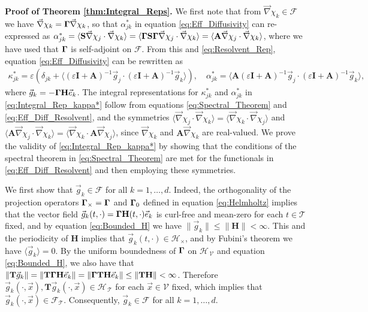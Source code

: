 \documentclass[11pt]{amsart}
\newcommand{\Tb}{\mathbf{T}}
\newcommand{\Hb}{\mathbf{H}}
\newcommand{\Ib}{\mathbf{I}}
\newcommand{\Sb}{\mathbf{S}}
\newcommand{\Ab}{\mathbf{A}}
\newcommand{\Tc}{\mathcal{T}}
\newcommand{\Vc}{\mathcal{V}}
\newcommand{\Hs}{\mathscr{H}}
\newcommand{\Fs}{\mathscr{F}}
\newcommand\bGamma{\mbox{\boldmath${\Gamma}$}}
\begin{document}
\textbf{Proof of Theorem \ref{thm:Integral_Reps}.}\hspace{1ex}
%
We first note that from $\vec{\nabla}\chi_k\in\Fs$ we have 
$\vec{\nabla}\chi_k=\bGamma\vec{\nabla}\chi_k$, so that $\alpha^*_{jk}$ in equation
\eqref{eq:Eff_Diffusivity} can re-expressed as
$\alpha^*_{jk}=\langle\Sb\vec{\nabla}\chi_j\cdot\vec{\nabla}\chi_k\rangle=\langle\bGamma\Sb\bGamma\vec{\nabla}\chi_j\cdot\vec{\nabla}\chi_k\rangle  
=\langle\Ab\vec{\nabla}\chi_j\cdot\vec{\nabla}\chi_k\rangle$, where we have used that $\bGamma$ is
self-adjoint on $\Fs$. From this and \eqref{eq:Resolvent_Rep},
equation \eqref{eq:Eff_Diffusivity} can be rewritten as
%
\begin{align}\label{eq:Eff_Diff_Resolvent}
 \kappa^*_{jk}=\varepsilon\left(\delta_{jk}+\langle(\varepsilon\Ib+\Ab)^{-1}\vec{g}_j\cdot(\varepsilon\Ib+\Ab)^{-1}\vec{g}_k\rangle\right), \quad
 \alpha^*_{jk}=\langle\Ab(\varepsilon\Ib+\Ab)^{-1}\vec{g}_j\cdot(\varepsilon\Ib+\Ab)^{-1}\vec{g}_k\rangle,
\end{align}
%
where $\vec{g}_k=-\bGamma\Hb\vec{e}_k$. The integral representations
for $\kappa^*_{jk}$ and $\alpha^*_{jk}$ in \eqref{eq:Integral_Rep_kappa*} follow
from equations \eqref{eq:Spectral_Theorem} and
\eqref{eq:Eff_Diff_Resolvent}, and the symmetries
$\langle\vec{\nabla}\chi_j\cdot\vec{\nabla}\chi_k\rangle=\langle\vec{\nabla}\chi_k\cdot\vec{\nabla}\chi_j\rangle$ and 
$\langle\Ab\vec{\nabla}\chi_j\cdot\vec{\nabla}\chi_k\rangle=\langle\vec{\nabla}\chi_k\cdot\Ab\vec{\nabla}\chi_j\rangle$, since
$\vec{\nabla}\chi_k$ and $\Ab\vec{\nabla}\chi_k$ are real-valued. We prove the
validity of \eqref{eq:Integral_Rep_kappa*} by showing that the
conditions of the spectral theorem in \eqref{eq:Spectral_Theorem} are
met for the functionals in \eqref{eq:Eff_Diff_Resolvent} and then
employing these symmetries.    





We first show that $\vec{g}_k\in\Fs$ for
all $k=1,\ldots,d$. Indeed, the orthogonality of the
projection operators $\bGamma_\times=\bGamma$ and $\bGamma_0$ defined in
equation \eqref{eq:Helmholtz} implies that the vector field
$\vec{g}_k(t,\cdot)=\bGamma\Hb(t,\cdot)\vec{e}_k$ is curl-free and mean-zero
for each $t\in\Tc$ fixed, and by equation \eqref{eq:Bounded_H} 
we have $\|\vec{g}_k\|\leq\|\Hb\|<\infty$. This and the periodicity of $\Hb$ implies
that $\vec{g}_k(t,\cdot)\in\Hs_\times$, and by Fubini's theorem \cite{Folland:99}
we have $\langle\vec{g}_k\rangle=0$.  By the uniform boundedness of $\bGamma$ on
$\Hs_{\,\Vc}$ and equation \eqref{eq:Bounded_H}, we also have
\cite{Folland:99} that
$\|\Tb\vec{g}_k\|=\|\Tb\bGamma\Hb\vec{e}_k\|=\|\bGamma\Tb\Hb\vec{e}_k\|\leq\|\Tb\Hb\|<\infty$.   
Therefore $\vec{g}_k(\cdot,\vec{x}),\Tb\vec{g}_k(\cdot,\vec{x})\in\Hs_{\,\Tc}$ for each
$\vec{x}\in\Vc$ fixed, which implies that
$\vec{g}_k(\cdot,\vec{x})\in\Fs_{\Tc}$. Consequently,  $\vec{g}_k\in\Fs$ for
all $k=1,\ldots,d$.
\end{document}
